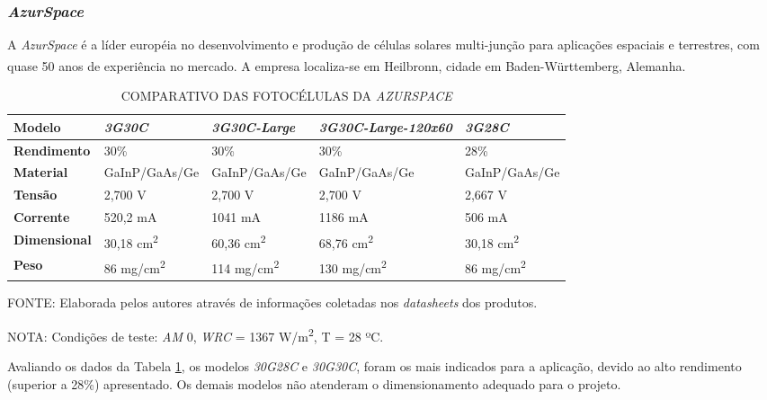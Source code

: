 \documentclass[
	12pt,				%
	openright,			%
	oneside,			%
	a4paper,			%
	english,			%
	french,				%
	spanish,			%
	brazil,				%
	oldfontcommands
	]{abntex2}
\begin{document}
\subsubsection[AzurSpace]{\textit{AzurSpace}}

	A \textit{AzurSpace} é a líder européia no desenvolvimento e produção de células solares multi-junção para aplicações espaciais e terrestres, com quase 50 anos de experiência no mercado. A empresa localiza-se em Heilbronn, cidade em Baden-Württemberg, Alemanha.\textsuperscript{\cite{AzurSpace}}
	
	\begin{table}[th]
	\caption{COMPARATIVO DAS FOTOCÉLULAS DA \textit{AZURSPACE}}
	\label{Tab_Azur_Comp}
	\begin{tabular}{p{2.5cm}|p{3.1cm}|p{3.1cm}|p{3.1cm}|p{3.1cm}}
		\textbf{Modelo} & \textit{\textbf{3G30C}} & \textit{\textbf{3G30C-Large}} & \textit{\textbf{3G30C-Large-120x60}} & \textit{\textbf{3G28C}} \\
		\hline
		\textbf{Rendimento} & 30\% & 30\% & 30\% & 28\% \\
		\hline
		\textbf{Material} & GaInP/GaAs/Ge & GaInP/GaAs/Ge & GaInP/GaAs/Ge & GaInP/GaAs/Ge\\
		\hline
		\textbf{Tensão} & 2,700 V & 2,700 V & 2,700 V & 2,667 V\\
		\hline
		\textbf{Corrente} & 520,2 mA & 1041 mA & 1186 mA & 506 mA\\
		\hline
		\textbf{Dimensional} & 30,18 cm\textsuperscript{2} & 60,36 cm\textsuperscript{2} & 68,76 cm\textsuperscript{2} & 30,18 cm\textsuperscript{2}\\
		\hline
		\textbf{Peso} & 86 mg/cm\textsuperscript{2} & 114 mg/cm\textsuperscript{2} & 130 mg/cm\textsuperscript{2} & 86 mg/cm\textsuperscript{2}\\
	\end{tabular}
	
	\begin{small}
	\vspace{3pt}
		FONTE: Elaborada pelos autores através de informações coletadas nos \textit{datasheets} dos produtos.
	\end{small}
	\begin{footnotesize}
		NOTA: Condições de teste: \textit{AM} 0, \textit{WRC} = 1367 W/m\textsuperscript{2}, T = 28 ºC.
	\end{footnotesize}
	\end{table}	
	
	Avaliando os dados da Tabela \ref{Tab_Azur_Comp}, os modelos \textit{30G28C} e \textit{30G30C}, foram os mais indicados para a aplicação, devido ao alto rendimento (superior a 28\%) apresentado. Os demais modelos não atenderam o dimensionamento adequado para o projeto.
	
\end{document}
